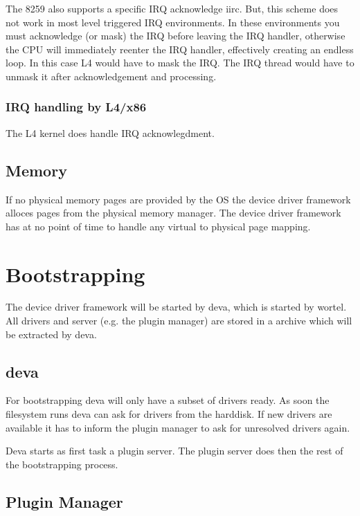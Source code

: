 The 8259 also supports a specific IRQ acknowledge iirc. But, this
scheme does not work in most level triggered IRQ environments. In
these environments you must acknowledge (or mask) the IRQ before
leaving the IRQ handler, otherwise the CPU will immediately reenter
the IRQ handler, effectively creating an endless loop. In this case L4
would have to mask the IRQ. The IRQ thread would have to unmask it
after acknowledgement and processing.

\subsubsection{IRQ handling by L4/x86}

The L4 kernel does handle IRQ acknowlegdment. 

\subsection{Memory}

If no physical memory pages are provided by the OS the device driver
framework alloces pages from the physical memory manager.  The device
driver framework has at no point of time to handle any virtual to
physical page mapping.


\section{Bootstrapping}

The device driver framework will be started by deva, which is started
by wortel.  All drivers and server (e.g. the plugin manager) are
stored in a archive which will be extracted by deva.

\subsection{deva}

For bootstrapping deva will only have a subset of drivers ready.  
As soon the filesystem runs deva can ask for drivers from the harddisk. 
If new drivers are available it has to inform the plugin manager to ask
for unresolved drivers again.

Deva starts as first task a plugin server.  The plugin server does
then the rest of the bootstrapping process.

\subsection{Plugin Manager}

